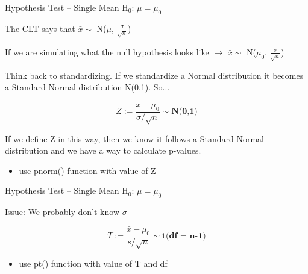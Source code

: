 \documentclass{beamer}
\begin{document}
\begin{frame}{Hypothesis Test -- Single Mean}
H$_0$: $\mu = \mu_0$ \vspace{4mm}

The CLT says that $\bar{x} \sim$ N($\mu$, $\frac{\sigma}{\sqrt{n}}$) \vspace{4mm}

If we are simulating what the null hypothesis looks like $\rightarrow$ $\bar{x} \sim$ N($\mu_0$, $\frac{\sigma}{\sqrt{n}}$) \vspace{4mm}

Think back to standardizing. If we standardize a Normal distribution it becomes a Standard Normal distribution N(0,1). So...\vspace{2mm}

\begin{equation*}
    Z := \frac{\bar{x}-\mu_0}{\sigma / \sqrt{n}} \sim \textbf{N(0,1)}
\end{equation*}

If we define Z in this way, then we know it follows a Standard Normal distribution and we have a way to calculate p-values.
\begin{itemize}
    \item use pnorm() function with value of Z
\end{itemize}
\end{frame}

\begin{frame}{Hypothesis Test -- Single Mean}
H$_0$: $\mu = \mu_0$ \vspace{4mm}

Issue: We probably don't know $\sigma$ \vspace{2mm}

\begin{equation*}
    T := \frac{\bar{x}-\mu_0}{s / \sqrt{n}} \sim \textbf{t(df = n-1)}
\end{equation*}
\begin{itemize}
    \item use pt() function with value of T and df
\end{itemize}
\end{frame}
\end{document}
